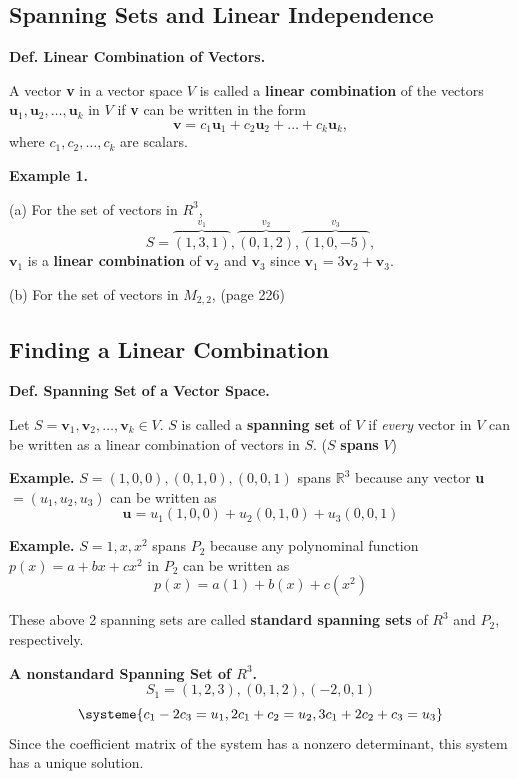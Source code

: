 \documentclass{article}
\newcommand\B{\textbf}
\newcommand\tcl{\begin{tcolorbox}[colback = {blue9}]}
\newcommand\etcl{\end{tcolorbox}}
\begin{document}
\begin{tcolorbox}
    \section{Spanning Sets and Linear Independence}

    \tcl
    \B{Def. Linear Combination of Vectors.} 

    A vector \B{v} in a vector space $V$ is called a \B{linear combination} of the vectors
    $\B{u}_1, \B{u}_2, \dots, \B{u}_k$ in $V$ if \B{v} can be written in the form
    \[ \B{v} = c_1\B{u}_1 + c_2\B{u}_2 + \dots + c_k\B{u}_k,\]
    where $c_1, c_2, \dots, c_k$ are scalars.
    \etcl 

    \B{Example 1. } 

    (a) For the set of vectors in $R^3$, 
    \[ S = {\overbrace{(1, 3, 1)}^{v_1}, 
        \overbrace{(0, 1, 2)}^{v_2},
        \overbrace{(1, 0, -5)}^{v_3}}, \]
   \quad  $\B{v}_1$ is a \B{linear combination} of $\B{v}_2$ and $\B{v}_3$ since $\B{v}_1 = 3\B{v}_2 + \B{v}_3$.

   (b) For the set of vectors in $M_{2,2}$, (page 226)

   \subsection{Finding a Linear Combination}
    \tcl
        \B{Def. Spanning Set of a Vector Space.} 

        Let $S = {\B{v}_1, \B{v}_2, \dots, \B{v}_k} \in V$. $S$ is called a \B{spanning set} of $V$ 
        if \textit{every} vector in $V$ can be written as a linear 
        combination of vectors in $S$. ($S$ \B{spans} $V$)
    \etcl 

    \B{Example.} $S = {(1,0,0), (0,1,0), (0,0,1)}$ spans $\mathbb{R}^3$ because any vector 
    \B{u} $= (u_1, u_2, u_3)$ can be written as 
    \[ \B{u} = u_1(1,0,0) + u_2(0,1,0) + u_3(0,0,1)\]

    \B{Example.} $S = {1, x, x^2}$ spans $P_2$ because any polynominal function
    $p(x) = a + bx + cx^2$ in $P_2$ can be written as
    \[p(x) = a(1) + b(x) + c(x^2) \]

    These above 2 spanning sets are called \B{standard spanning sets} of $R^3$ and $P_2$, respectively.

    \B{A nonstandard Spanning Set of $R^3$. }
    \[S_1 = {(1,2,3), (0,1,2), (-2,0,1)}\]
    \[ \systeme{
            c_1 - 2c_3 = u_1,
            2c_1 + c_2 = u_2,
            3c_1 + 2c_2 + c_3 = u_3
        } \]
    Since the coefficient matrix of the system has a nonzero determinant, this system has a unique solution.


\end{tcolorbox}
\end{document}
